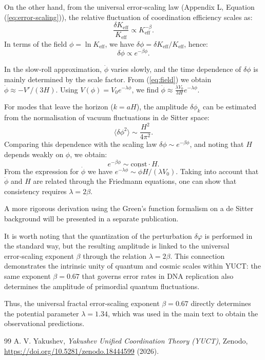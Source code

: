 \documentclass[12pt]{article}
\theoremstyle{remark}
\newcommand{\Keff}{K_{\mathrm{eff}}}
\begin{document}
	On the other hand, from the universal error‑scaling law (Appendix L, Equation (\ref{eq:error-scaling})), the relative fluctuation of coordination efficiency scales as:
	\begin{equation}
		\frac{\delta\Keff}{\Keff} \propto \Keff^{-\beta}.
	\end{equation}
	In terms of the field $\phi = \ln\Keff$, we have $\delta\phi = \delta\Keff/\Keff$, hence:
	\begin{equation}
		\delta\phi \propto e^{-\beta\phi}.
	\end{equation}
	
	In the slow‑roll approximation, $\dot{\phi}$ varies slowly, and the time dependence of $\delta\phi$ is mainly determined by the scale factor. From (\ref{eq:field}) we obtain $\dot{\phi} \approx -V'/(3H)$. Using $V(\phi) = V_0 e^{-\lambda\phi}$, we find $\dot{\phi} \approx \frac{\lambda V_0}{3H} e^{-\lambda\phi}$.
	
	For modes that leave the horizon ($k = aH$), the amplitude $\delta\phi_k$ can be estimated from the normalisation of vacuum fluctuations in de Sitter space:
	\begin{equation}
		\langle \delta\phi^2 \rangle \sim \frac{H^2}{4\pi^2}.
	\end{equation}
	Comparing this dependence with the scaling law $\delta\phi \sim e^{-\beta\phi}$, and noting that $H$ depends weakly on $\phi$, we obtain:
	\begin{equation}
		e^{-\beta\phi} \sim \text{const} \cdot H.
	\end{equation}
	From the expression for $\dot{\phi}$ we have $e^{-\lambda\phi} \sim \dot{\phi} H / (\lambda V_0)$. Taking into account that $\dot{\phi}$ and $H$ are related through the Friedmann equations, one can show that consistency requires $\lambda = 2\beta$.
	
	A more rigorous derivation using the Green's function formalism on a de Sitter background will be presented in a separate publication.
	
	It is worth noting that the quantization of the perturbation $\delta\varphi$ is performed in the standard way, but the resulting amplitude is linked to the universal error‑scaling exponent $\beta$ through the relation $\lambda = 2\beta$. This connection demonstrates the intrinsic unity of quantum and cosmic scales within YUCT: the same exponent $\beta = 0.67$ that governs error rates in DNA replication also determines the amplitude of primordial quantum fluctuations.
	
	Thus, the universal fractal error‑scaling exponent $\beta = 0.67$ directly determines the potential parameter $\lambda = 1.34$, which was used in the main text to obtain the observational predictions.
	
	\begin{thebibliography}{99}
		A. V. Yakushev, \emph{Yakushev Unified Coordination Theory (YUCT)}, Zenodo, \url{https://doi.org/10.5281/zenodo.18444599} (2026).
	\end{thebibliography}
	
\end{document}
